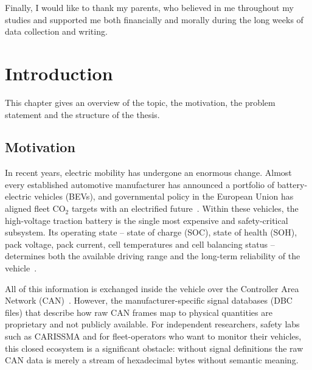 \documentclass[11pt,a4paper,oneside,parskip=half]{scrreprt}
\begin{document}
Finally, I would like to thank my parents, who believed in me throughout my studies and supported me both financially and morally during the long weeks of data collection and writing.

\tableofcontents
{}

\listoffigures
{}

\listoftables
{}

\clearpage
{}
\setcounter{page}{1}

\chapter{Introduction}
This chapter gives an overview of the topic, the motivation, the problem statement and the structure of the thesis.

\section{Motivation}
In recent years, electric mobility has undergone an enormous change. Almost every established automotive manufacturer has announced a portfolio of battery-electric vehicles (BEVs), and governmental policy in the European Union has aligned fleet CO$_2$ targets with an electrified future~\cite{schaal2020meb}. Within these vehicles, the high-voltage traction battery is the single most expensive and safety-critical subsystem. Its operating state -- state of charge (SOC), state of health (SOH), pack voltage, pack current, cell temperatures and cell balancing status -- determines both the available driving range and the long-term reliability of the vehicle~\cite{xiong2018critical,park2021data}.

All of this information is exchanged inside the vehicle over the Controller Area Network (CAN)~\cite{iso11898}. However, the manufacturer-specific signal databases (DBC files) that describe how raw CAN frames map to physical quantities are proprietary and not publicly available. For independent researchers, safety labs such as CARISSMA and for fleet-operators who want to monitor their vehicles, this closed ecosystem is a significant obstacle: without signal definitions the raw CAN data is merely a stream of hexadecimal bytes without semantic meaning.
\end{document}
